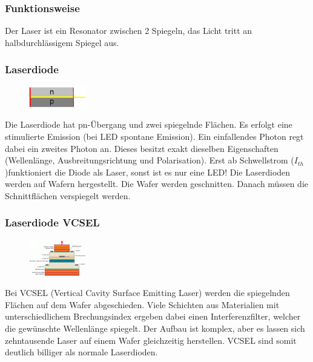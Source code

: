 \subsubsection{Funktionsweise}
Der Laser ist ein Resonator zwischen 2 Spiegeln, das Licht tritt an halbdurchlässigem Spiegel aus.

\subsubsection{Laserdiode}
\begin{figure}
    \vspace{-12pt}
    \centering
    \includegraphics[width=0.22\textwidth]{images/laserdiode}
\end{figure}
Die Laserdiode hat pn-Übergang und zwei spiegelnde Flächen. Es erfolgt eine stimulierte Emission (bei LED spontane Emission). Ein einfallendes Photon regt dabei ein zweites Photon an. Dieses besitzt exakt dieselben Eigenschaften (Wellenlänge, Ausbreitungsrichtung und Polarisation). Erst ab Schwellstrom ($I_{th}$)funktioniert die Diode als Laser, sonst ist es nur eine LED! Die Laserdioden werden auf Wafern hergestellt. Die Wafer werden geschnitten. Danach müssen die Schnittflächen verspiegelt werden. 

\subsubsection{Laserdiode VCSEL}
\begin{figure}
    \vspace{-12pt}
    \centering
    \includegraphics[width=0.22\textwidth]{images/vcsel}
\end{figure}
Bei VCSEL (Vertical Cavity Surface Emitting Laser) werden die spiegelnden Flächen auf dem Wafer abgeschieden. Viele Schichten aus Materialien mit unterschiedlichem Brechungsindex ergeben dabei einen Interferenzfilter, welcher die gewünschte Wellenlänge spiegelt. Der Aufbau ist komplex, aber es lassen sich zehntausende Laser auf einem Wafer gleichzeitig herstellen. VCSEL sind somit deutlich billiger als normale Laserdioden.




